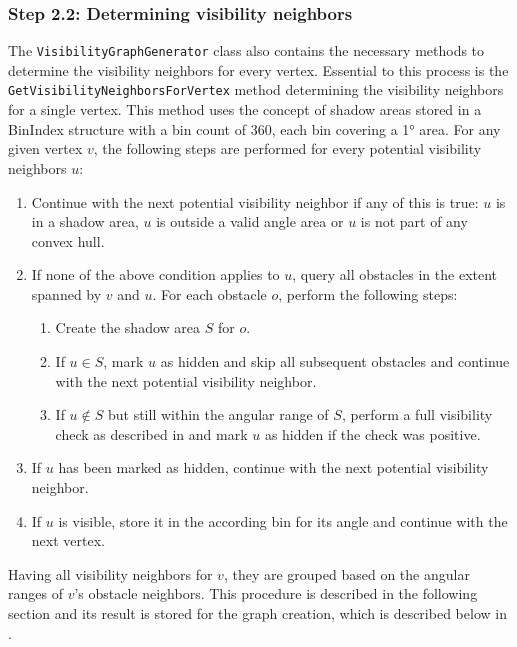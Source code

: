 		\subsubsection{Step 2.2: Determining visibility neighbors}
		
			The \texttt{VisibilityGraphGenerator} class also contains the necessary methods to determine the visibility neighbors for every vertex.
			Essential to this process is the \texttt{GetVisibilityNeighborsForVertex} method determining the visibility neighbors for a single vertex.
			This method uses the concept of shadow areas stored in a BinIndex structure with a bin count of 360, each bin covering a 1° area.
			For any given vertex $v$, the following steps are performed for every potential visibility neighbors $u$:
			\begin{enumerate}[leftmargin=2.25em+\widthof{2.2.},label={2.2.\arabic*.}]
				\item Continue with the next potential visibility neighbor if any of this is true: $u$ is in a shadow area, $u$ is outside a valid angle area or $u$ is not part of any convex hull.
				\item If none of the above condition applies to $u$, query all obstacles in the extent spanned by $v$ and $u$. For each obstacle $o$, perform the following steps:
				\begin{enumerate}[leftmargin=2.25em+\widthof{2.2.}-1em]
					\item Create the shadow area $S$ for $o$.
					\item If $u \in S$, mark $u$ as hidden and skip all subsequent obstacles and continue with the next potential visibility neighbor.
					\item If $u \not\in S$ but still within the angular range of $S$, perform a full visibility check as described in  and mark $u$ as hidden if the check was positive.
				\end{enumerate}
				\item If $u$ has been marked as hidden, continue with the next potential visibility neighbor.
				\item If $u$ is visible, store it in the according bin for its angle and continue with the next vertex.
			\end{enumerate}
			Having all visibility neighbors for $v$, they are grouped based on the angular ranges of $v$'s obstacle neighbors.
			This procedure is described in the following section and its result is stored for the graph creation, which is described below in .
		
